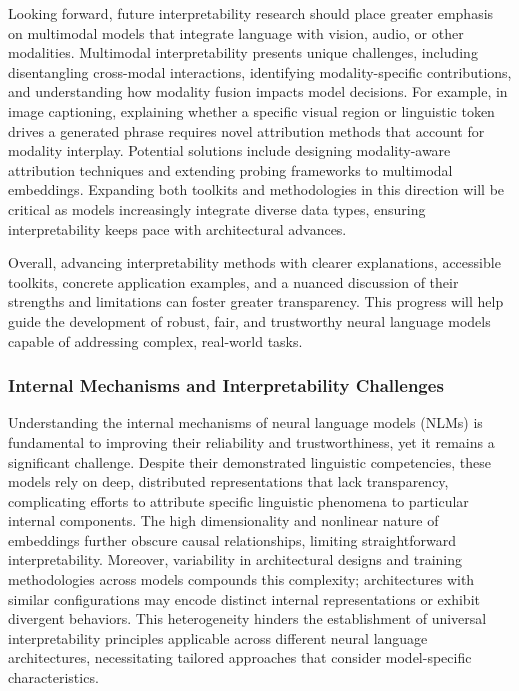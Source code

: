 \documentclass[sigconf]{acmart}
\begin{document}
Looking forward, future interpretability research should place greater emphasis on multimodal models that integrate language with vision, audio, or other modalities. Multimodal interpretability presents unique challenges, including disentangling cross-modal interactions, identifying modality-specific contributions, and understanding how modality fusion impacts model decisions. For example, in image captioning, explaining whether a specific visual region or linguistic token drives a generated phrase requires novel attribution methods that account for modality interplay. Potential solutions include designing modality-aware attribution techniques and extending probing frameworks to multimodal embeddings. Expanding both toolkits and methodologies in this direction will be critical as models increasingly integrate diverse data types, ensuring interpretability keeps pace with architectural advances.

Overall, advancing interpretability methods with clearer explanations, accessible toolkits, concrete application examples, and a nuanced discussion of their strengths and limitations can foster greater transparency. This progress will help guide the development of robust, fair, and trustworthy neural language models capable of addressing complex, real-world tasks.

\subsubsection{Internal Mechanisms and Interpretability Challenges}

Understanding the internal mechanisms of neural language models (NLMs) is fundamental to improving their reliability and trustworthiness, yet it remains a significant challenge. Despite their demonstrated linguistic competencies, these models rely on deep, distributed representations that lack transparency, complicating efforts to attribute specific linguistic phenomena to particular internal components. The high dimensionality and nonlinear nature of embeddings further obscure causal relationships, limiting straightforward interpretability. Moreover, variability in architectural designs and training methodologies across models compounds this complexity; architectures with similar configurations may encode distinct internal representations or exhibit divergent behaviors. This heterogeneity hinders the establishment of universal interpretability principles applicable across different neural language architectures, necessitating tailored approaches that consider model-specific characteristics.
\end{document}
